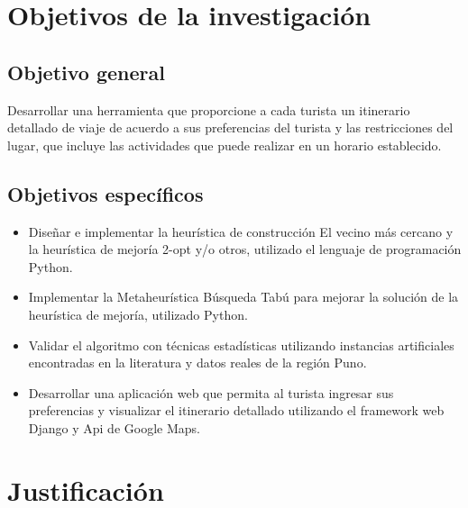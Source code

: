 \section{Objetivos de la investigación}

\subsection{Objetivo general}
Desarrollar una herramienta que proporcione a cada turista un itinerario detallado de viaje de acuerdo a sus preferencias del turista y las restricciones del lugar, que incluye las actividades que puede realizar en un horario establecido.

\subsection{Objetivos específicos}
\begin{itemize}
\item Diseñar e implementar la heurística de construcción El vecino más cercano y la heurística de mejoría 2-opt y/o otros, utilizado el lenguaje de programación Python.
\item Implementar la Metaheurística Búsqueda Tabú para mejorar la solución de la heurística de mejoría, utilizado Python.
\item Validar el algoritmo con técnicas estadísticas utilizando instancias artificiales encontradas en la literatura y datos reales de la región Puno.
\item Desarrollar una aplicación web que permita al turista ingresar sus preferencias y visualizar el itinerario detallado utilizando el framework web Django y Api de Google Maps.
\end{itemize}
\section{Justificación}

